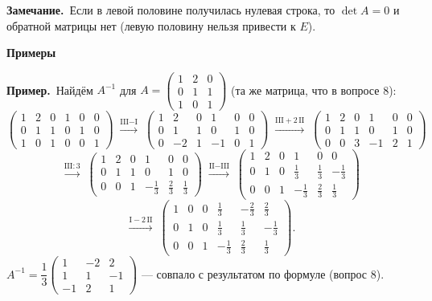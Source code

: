 \documentclass[a4paper,11pt]{article}
\newcommand{\gauss}[1]{\;\xrightarrow{\scriptstyle #1}\;}
\newcommand{\prim}{\par\smallskip\noindent\textbf{\textcolor{teoc!80!black}{Пример.}}\ }
\newcommand{\zam}{\par\smallskip\noindent\textbf{\textcolor{zamc}{Замечание.}}\ }
\newcommand{\podr}[1]{\par\needspace{8\baselineskip}\medskip
  {\large\bfseries\textcolor{oprc!80!black}{#1}}\par\nopagebreak\smallskip}
\begin{document}
\zam Если в левой половине получилась нулевая строка, то $\det A = 0$ и обратной матрицы нет
(левую половину нельзя привести к $E$).

\podr{Примеры}

\prim Найдём $A^{-1}$ для $A = \begin{pmatrix} 1 & 2 & 0 \\ 0 & 1 & 1 \\ 1 & 0 & 1 \end{pmatrix}$ (та же матрица, что в вопросе 8):
\[
  \left(\begin{array}{rrr|rrr} 1 & 2 & 0 & 1 & 0 & 0 \\ 0 & 1 & 1 & 0 & 1 & 0 \\ 1 & 0 & 1 & 0 & 0 & 1 \end{array}\right)
  \gauss{\text{III} - \text{I}}
  \left(\begin{array}{rrr|rrr} 1 & 2 & 0 & 1 & 0 & 0 \\ 0 & 1 & 1 & 0 & 1 & 0 \\ 0 & -2 & 1 & -1 & 0 & 1 \end{array}\right)
  \gauss{\text{III} + 2\,\text{II}}
  \left(\begin{array}{rrr|rrr} 1 & 2 & 0 & 1 & 0 & 0 \\ 0 & 1 & 1 & 0 & 1 & 0 \\ 0 & 0 & 3 & -1 & 2 & 1 \end{array}\right)
\]
\[
  \gauss{\text{III} : 3}
  \left(\begin{array}{rrr|rrr} 1 & 2 & 0 & 1 & 0 & 0 \\ 0 & 1 & 1 & 0 & 1 & 0 \\ 0 & 0 & 1 & -\frac13 & \frac23 & \frac13 \end{array}\right)
  \gauss{\text{II} - \text{III}}
  \left(\begin{array}{rrr|rrr} 1 & 2 & 0 & 1 & 0 & 0 \\ 0 & 1 & 0 & \frac13 & \frac13 & -\frac13 \\ 0 & 0 & 1 & -\frac13 & \frac23 & \frac13 \end{array}\right)
\]
\[
  \gauss{\text{I} - 2\,\text{II}}
  \left(\begin{array}{rrr|rrr} 1 & 0 & 0 & \frac13 & -\frac23 & \frac23 \\ 0 & 1 & 0 & \frac13 & \frac13 & -\frac13 \\ 0 & 0 & 1 & -\frac13 & \frac23 & \frac13 \end{array}\right).
\]
$A^{-1} = \dfrac13 \begin{pmatrix} 1 & -2 & 2 \\ 1 & 1 & -1 \\ -1 & 2 & 1 \end{pmatrix}$ --- совпало с результатом по формуле (вопрос 8). \checkmark
\end{document}

